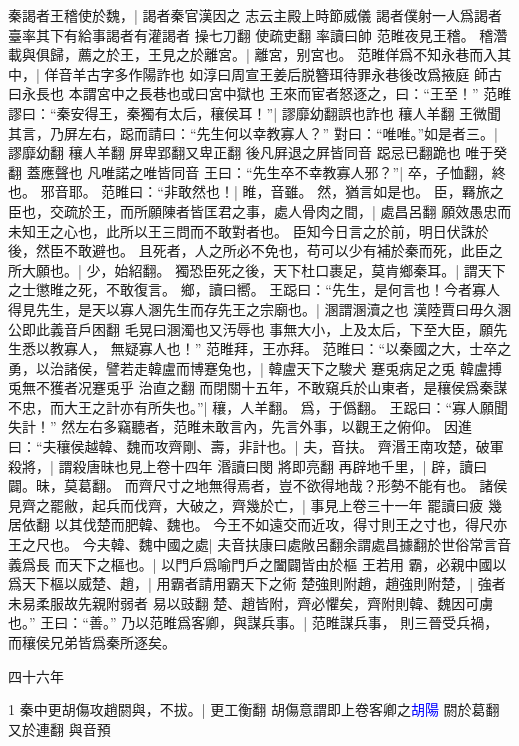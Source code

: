 秦謁者王稽使於魏，|{
	謁者秦官漢因之
	志云主殿上時節威儀
	謁者僕射一人爲謁者臺率其下有給事謁者有灌謁者
	操七刀翻
	使疏吏翻
	率讀曰帥
	}
范睢夜見王稽。
稽濳載與俱歸，薦之於王，王見之於離宮。|{
	離宮，别宮也。
	}
范睢佯爲不知永巷而入其中，|{
	佯音羊古字多作陽詐也
	如淳曰周宣王姜后脱簪珥待罪永巷後改爲掖庭
	師古曰永長也
	本謂宮中之長巷也或曰宮中獄也}
王來而宦者怒逐之，曰：“王至！”
范睢謬曰：“秦安得王，秦獨有太后，穰侯耳！”|{
	謬靡幼翻誤也詐也
	穰人羊翻}
王微聞其言，乃屏左右，跽而請曰：“先生何以幸教寡人？”
對曰：“唯唯。”如是者三。|{
	謬靡幼翻
	穰人羊翻
	屏卑郢翻又卑正翻
	後凡屛退之屛皆同音
	跽忌已翻跪也
	唯于癸翻
	蓋應聲也
	凡唯諾之唯皆同音
	}
王曰：“先生卒不幸教寡人邪？”|{
	卒，子恤翻，終也。
	邪音耶。
	}
范睢曰：“非敢然也！|{
	睢，音雖。
	然，猶言如是也。
	}
臣，羇旅之臣也，交疏於王，而所願陳者皆匡君之事，處人骨肉之間，|{
	處昌呂翻
	}
願效愚忠而未知王之心也，此所以王三問而不敢對者也。
臣知今日言之於前，明日伏誅於後，然臣不敢避也。
且死者，人之所必不免也，苟可以少有補於秦而死，此臣之所大願也。|{
	少，始紹翻。
	}
獨恐臣死之後，天下杜口裹足，莫肯鄉秦耳。|{
	謂天下之士懲睢之死，不敢復言。
	鄉，讀曰嚮。
	}
王跽曰：“先生，是何言也！今者寡人得見先生，是天以寡人溷先生而存先王之宗廟也。|{
	溷謂溷瀆之也
	漢陸賈曰毋久溷公即此義音戶困翻
	毛晃曰溷濁也又汚辱也
	}
事無大小，上及太后，下至大臣，願先生悉以教寡人，
無疑寡人也！”
范睢拜，王亦拜。
范睢曰：“以秦國之大，士卒之勇，以治諸侯，譬若走韓盧而博蹇兔也，|{%
	韓盧天下之駿犬
	蹇兎病足之兎
	韓盧搏兎無不獲者况蹇兎乎
	治直之翻
	}
而閉關十五年，不敢窺兵於山東者，是穰侯爲秦謀不忠，而大王之計亦有所失也。”|{
	穰，人羊翻。
	爲，于僞翻。
	}
王跽曰：“寡人願聞失計！”
然左右多竊聽者，范睢未敢言內，先言外事，以觀王之俯仰。
因進曰：“夫穰侯越韓、魏而攻齊剛、壽，非計也。|{
	夫，音扶。
	}
齊湣王南攻楚，破軍殺將，|{
	謂殺唐昧也見上卷十四年
	湣讀曰閔
	將即亮翻
	}
再辟地千里，|{
	辟，讀曰闢。昧，莫葛翻。
	}
而齊尺寸之地無得焉者，豈不欲得地哉？形勢不能有也。
諸侯見齊之罷敝，起兵而伐齊，大破之，齊幾於亡，|{
	事見上卷三十一年
	罷讀曰疲
	幾居依翻
	}
以其伐楚而肥韓、魏也。
今王不如遠交而近攻，得寸則王之寸也，得尺亦王之尺也。
今夫韓、魏中國之處|{
	夫音扶康曰處敞呂翻余謂處昌據翻於世俗常言音義爲長}
而天下之樞也。|{
	以門戶爲喻門戶之闔闢皆由於樞}
王若用%
霸，必親中國以爲天下樞以威楚、趙，|{
	用霸者請用霸天下之術}
楚強則附趙，趙強則附楚，|{
	強者未易柔服故先親附弱者
	易以豉翻}
楚、趙皆附，齊必懼矣，齊附則韓、魏因可虜也。”
王曰：“善。”
乃以范睢爲客卿，與謀兵事。|{
	范睢謀兵事，
	則三晉受兵禍，
	而穰侯兄弟皆爲秦所逐矣。
	}


四十六年

1 秦中更胡傷攻趙閼與，不拔。|{
	更工衡翻
	胡傷意謂即上卷客卿之\textcolor{blue}{胡陽}
	閼於葛翻又於連翻
	與音預
	}


